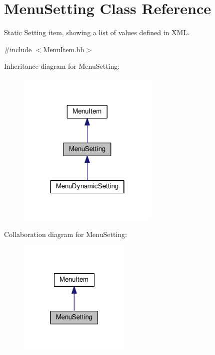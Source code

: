 \hypertarget{classMenuSetting}{}\section{Menu\+Setting Class Reference}
\label{classMenuSetting}


Static Setting item, showing a list of values defined in X\+ML.  




{\ttfamily \#include $<$Menu\+Item.\+hh$>$}



Inheritance diagram for Menu\+Setting\+:
\nopagebreak
\begin{figure}[H]
\begin{center}
\leavevmode
\includegraphics[width=190pt]{classMenuSetting__inherit__graph}
\end{center}
\end{figure}


Collaboration diagram for Menu\+Setting\+:\nopagebreak
\begin{figure}[H]
\begin{center}
\leavevmode
\includegraphics[width=151pt]{classMenuSetting__coll__graph}
\end{center}
\end{figure}
